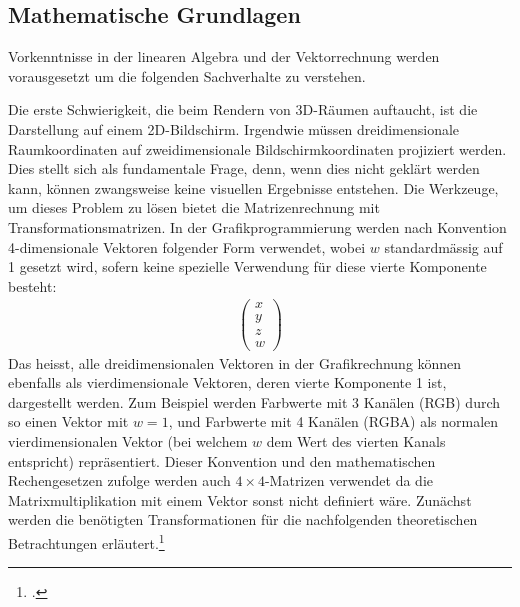 \documentclass[titlepage, 11pt, a4paper, ngerman]{article}
\begin{document}
\subsection{Mathematische Grundlagen}
Vorkenntnisse in der linearen Algebra und der Vektorrechnung werden vorausgesetzt um die folgenden Sachverhalte zu verstehen.\par
Die erste Schwierigkeit, die beim Rendern von 3D-Räumen auftaucht, ist die Darstellung auf einem 2D-Bildschirm. Irgendwie müssen dreidimensionale Raumkoordinaten auf zweidimensionale Bildschirmkoordinaten projiziert werden. Dies stellt sich als fundamentale Frage, denn, wenn dies nicht geklärt werden kann, können zwangsweise keine visuellen Ergebnisse entstehen. Die Werkzeuge, um dieses Problem zu lösen bietet die Matrizenrechnung mit Transformationsmatrizen. In der Grafikprogrammierung werden nach Konvention 4-dimensionale Vektoren folgender Form verwendet, wobei $w$ standardmässig auf 1 gesetzt wird, sofern keine spezielle Verwendung für diese vierte Komponente besteht: 
\begin{align*}
    \begin{pmatrix}
    x \\
    y \\
    z \\
    w
    \end{pmatrix} 
\end{align*}
\bigbreak
Das heisst, alle dreidimensionalen Vektoren in der Grafikrechnung können ebenfalls als vierdimensionale Vektoren, deren vierte Komponente 1 ist, dargestellt werden. Zum Beispiel werden Farbwerte mit 3 Kanälen (RGB) durch so einen Vektor mit $w = 1$, und Farbwerte mit 4 Kanälen (RGBA) als normalen vierdimensionalen Vektor (bei welchem $w$ dem Wert des vierten Kanals entspricht) repräsentiert. Dieser Konvention und den mathematischen Rechengesetzen zufolge werden auch $4\times4$-Matrizen verwendet da die Matrixmultiplikation mit einem Vektor sonst nicht definiert wäre. Zunächst werden die benötigten Transformationen für die nachfolgenden theoretischen Betrachtungen erläutert.\footcite{transformations}
\end{document}
